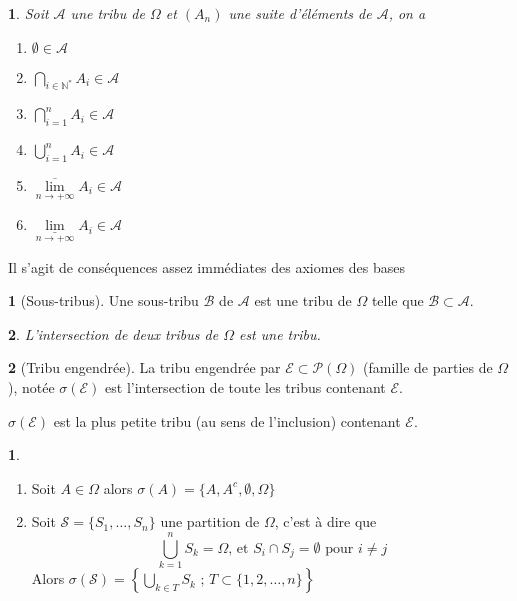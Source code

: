 \documentclass[8pt,notheorems]{beamer}
\def \N{\mathbb N}
\def \limsup{\underset{n\rightarrow+\infty}{\overline{\lim}}}
\def \liminf{\underset{n\rightarrow+\infty}{\underline{\lim}}}
\newtheorem{prop}{\translate{Proposition}}
\theoremstyle{definition}
\newtheorem{definition}{\translate{Definition}}
\theoremstyle{example}
\newtheorem{example}{\translate{Exemple}}
\theoremstyle{mystyle}
\theoremstyle{plain}
\begin{document}
\begin{frame}[allowframebreaks]
\begin{prop}
Soit $\mathcal{A}$ une tribu de $\Omega$ et $(A_n)$ une suite d'éléments de $\mathcal{A}$, on a 
\begin{enumerate}
    \item $\emptyset\in\mathcal{A}$
    \item $\bigcap_{i\in\N^\ast}A_i\in\mathcal{A}$
    \item $\bigcap_{i = 1}^{n}A_i\in\mathcal{A}$
    \item $\bigcup_{i = 1}^{n}A_i\in\mathcal{A}$
    \item $\limsup A_i\in\mathcal{A}$
    \item $\liminf A_i\in\mathcal{A}$
\end{enumerate}
\end{prop}
Il s'agit de conséquences assez immédiates des axiomes des bases
\begin{definition}[Sous-tribus]
Une sous-tribu $\mathcal{B}$ de $\mathcal{A}$ est une tribu de $\Omega$ telle que $\mathcal{B}\subset\mathcal{A}$.
\end{definition}
\begin{prop}
L'intersection de deux tribus de $\Omega$ est une tribu. 
\end{prop}
\begin{definition}[Tribu engendrée]
La tribu engendrée par $\mathcal{E}\subset\mathcal{P}(\Omega)$ (famille de parties de $\Omega$), notée $\sigma(\mathcal{E})$ est l'intersection de toute les tribus contenant $\mathcal{E}$.
\end{definition}
$\sigma(\mathcal{E})$ est la plus petite tribu (au sens de l'inclusion) contenant $\mathcal{E}$. 
\begin{example}
\begin{enumerate}
\item Soit $A\in\Omega$ alors $\sigma(A)=\{A,A^{c},\emptyset,\Omega\}$
\item Soit $\mathcal{S}=\{S_1,\ldots,S_n\}$ une partition de $\Omega$, c'est à dire que
$$
\bigcup_{k=1}^{n}S_k=\Omega\text{, et }S_i\cap S_j=\emptyset\text{ pour }i\neq j
$$
Alors $\sigma(\mathcal{S})=\left\{\bigcup_{k\in T}S_k\text{ ; }T\subset\{1,2,\ldots,n\}\right\}$
\end{enumerate}
\end{example}
\end{frame}
\end{document}

